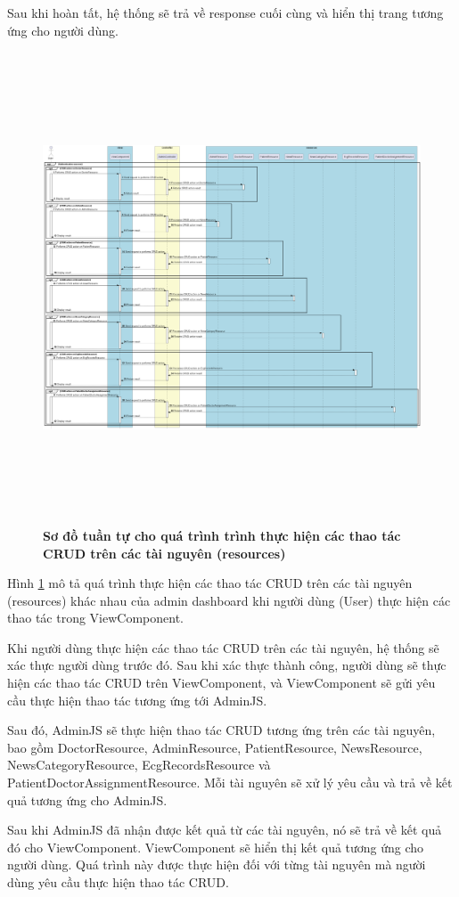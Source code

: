 \begin{enumerate}[a)]
Sau khi hoàn tất, hệ thống sẽ trả về response cuối cùng và hiển thị trang tương ứng cho người dùng.


\begin{figure}[H]
  \centering
  \includegraphics[width=16cm,height=14cm]{Images/server/sequence/web/seq_crud.png}
  \caption[Sơ đồ tuần tự cho quá trình trình thực hiện các thao tác CRUD trên các tài nguyên (resources) ]{\bfseries \fontsize{12pt}{0pt}
  \selectfont Sơ đồ tuần tự cho quá trình trình thực hiện các thao tác CRUD trên các tài nguyên (resources) }
  \label{seq_crud} %
\end{figure}
Hình \ref{seq_crud}  mô tả quá trình thực hiện các thao tác CRUD trên các tài nguyên (resources) khác nhau của admin dashboard khi người dùng (User) thực hiện các thao tác trong ViewComponent.


Khi người dùng thực hiện các thao tác CRUD trên các tài nguyên, hệ thống sẽ xác thực người dùng trước đó. Sau khi xác thực thành công, người dùng sẽ thực hiện các thao tác CRUD trên ViewComponent, và ViewComponent sẽ gửi yêu cầu thực hiện thao tác tương ứng tới AdminJS.


Sau đó, AdminJS sẽ thực hiện thao tác CRUD tương ứng trên các tài nguyên, bao gồm DoctorResource, AdminResource, PatientResource, NewsResource, NewsCategoryResource, EcgRecordsResource và PatientDoctorAssignmentResource. Mỗi tài nguyên sẽ xử lý yêu cầu và trả về kết quả tương ứng cho AdminJS.


Sau khi AdminJS đã nhận được kết quả từ các tài nguyên, nó sẽ trả về kết quả đó cho ViewComponent. ViewComponent sẽ hiển thị kết quả tương ứng cho người dùng. Quá trình này được thực hiện đối với từng tài nguyên mà người dùng yêu cầu thực hiện thao tác CRUD.


\end{enumerate}



